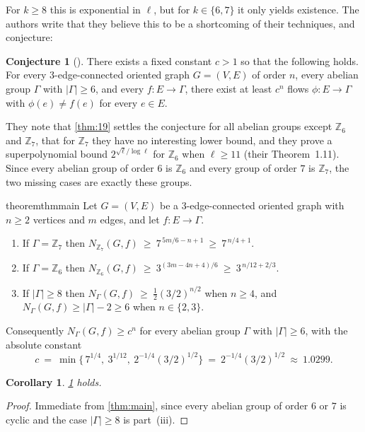 \documentclass[11pt,a4paper]{article}
\theoremstyle{plain}
\newtheorem{corollary}[theorem]{Corollary}
\theoremstyle{definition}
\newtheorem{conjecture}[theorem]{Conjecture}
\theoremstyle{remark}
\newcommand{\Z}{{\mathbb Z}}
\newcommand{\Nf}{N}
\begin{document}
For $k\ge8$ this is exponential in $\ell$, but for $k\in\{6,7\}$ it only yields existence. The authors write that they believe this to be a shortcoming of their techniques, and conjecture:

\begin{conjecture}[{\cite[Conjecture~1.10]{DLMS20}}]\label{conj:110}
There exists a fixed constant $c>1$ so that the following holds. For every $3$-edge-connected oriented graph $G=(V,E)$ of order $n$, every abelian group $\Gamma$ with $|\Gamma|\ge6$, and every $f\colon E\to\Gamma$, there exist at least $c^n$ flows $\phi\colon E\to\Gamma$ with $\phi(e)\ne f(e)$ for every $e\in E$.
\end{conjecture}

They note that \cref{thm:19} settles the conjecture for all abelian groups except $\Z_6$ and $\Z_7$, that for $\Z_7$ they have no interesting lower bound, and they prove a superpolynomial bound $2^{\sqrt{\ell}/\log\ell}$ for $\Z_6$ when $\ell\ge11$ (their Theorem~1.11). Since every abelian group of order $6$ is $\Z_6$ and every group of order $7$ is $\Z_7$, the two missing cases are exactly these groups.

\begin{restatable}{theorem}{thmmain}\label{thm:main}
Let $G=(V,E)$ be a $3$-edge-connected oriented graph with $n\ge2$ vertices and $m$ edges, and let $f\colon E\to\Gamma$.
\begin{enumerate}[label=(\roman*),nosep]
\item If $\Gamma=\Z_7$ then $\Nf_{\Z_7}(G,f)\ \ge\ 7^{\,5m/6-n+1}\ \ge\ 7^{\,n/4+1}$.
\item If $\Gamma=\Z_6$ then $\Nf_{\Z_6}(G,f)\ \ge\ 3^{(3m-4n+4)/6}\ \ge\ 3^{\,n/12+2/3}$.
\item If $|\Gamma|\ge8$ then $\Nf_\Gamma(G,f)\ \ge\ \tfrac12(3/2)^{n/2}$ when $n\ge4$, and $\Nf_\Gamma(G,f)\ge|\Gamma|-2\ge6$ when $n\in\{2,3\}$.
\end{enumerate}
Consequently $\Nf_\Gamma(G,f)\ge c^n$ for every abelian group $\Gamma$ with $|\Gamma|\ge6$, with the absolute constant
\[
 c\ =\ \min\bigl\{\,7^{1/4},\ 3^{1/12},\ 2^{-1/4}(3/2)^{1/2}\bigr\}\ =\ 2^{-1/4}(3/2)^{1/2}\ \approx\ 1.0299 .
\]
\end{restatable}

\begin{corollary}\label{cor:conj}
\cref{conj:110} holds.
\end{corollary}
\begin{proof}
Immediate from \cref{thm:main}, since every abelian group of order $6$ or $7$ is cyclic and the case $|\Gamma|\ge8$ is part~(iii).
\end{proof}
\end{document}
